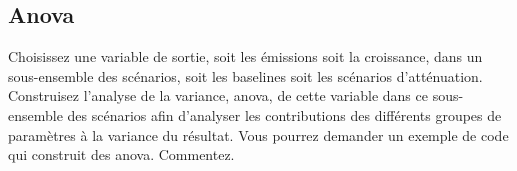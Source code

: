 \documentclass[a4,11pt]{aleph-notas}
\newcommand{\ans}[1]{
\begin{mdframed}[
    roundcorner=10pt,     %
    backgroundcolor=gray!20, %
    linecolor=black,      %
    linewidth=1pt,        %
    innertopmargin=10pt,  %
    innerbottommargin=10pt, %
    innerleftmargin=10pt,  %
    innerrightmargin=10pt  %
]
#1
\end{mdframed}
}
\begin{document}
\subsection{Anova}
\ans{Choisissez une variable de sortie, soit les émissions soit la croissance, dans un sous-ensemble des scénarios, soit les baselines soit les scénarios d’atténuation. Construisez l’analyse de la variance, anova, de cette variable dans ce sous-ensemble des scénarios afin d’analyser les contributions des différents groupes de paramètres à la variance du résultat. Vous pourrez demander un exemple de code qui construit des anova. Commentez.}

\end{document}
